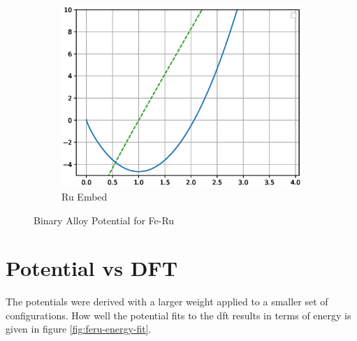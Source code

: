 \begin{figure}[htb]
\begin{subfigure}{.32\textwidth}
  \includegraphics[width=.94\linewidth]{chapters/potentials_fe_pd_ru/feru_potential/function_plots/ru_embe.eps}  
  \caption{Ru Embed}
  \label{fig:feru-ru-embe}
\end{subfigure}
\label{fig:fepd-fcc-function-plots}
\caption{Binary Alloy Potential for Fe-Ru}
\end{figure}









\clearpage
\section{Potential vs DFT}

The potentials were derived with a larger weight applied to a smaller set of configurations.  How well the potential fits to the \acrshort{dft} results in terms of energy is given in figure \ref{fig:feru-energy-fit}.

